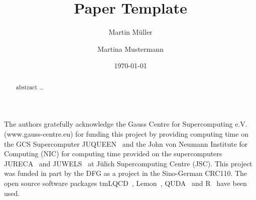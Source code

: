\documentclass[aps,floatfix,prd,nofootinbib,superscriptaddress,reprint,showpacs,10pt,preprintnumbers,longbibliography]{revtex4-1}
\begin{document}
\title{Paper Template}
\author{Martin Müller}
\author{Martina Mustermann}
\date{\today}
\begin{abstract}
  abstract \ldots
\end{abstract}

\maketitle


\begin{acknowledgments}
  The authors gratefully acknowledge the Gauss Centre for Supercomputing
  e.V. (www.gauss-centre.eu) for funding this project by providing
  computing time on the GCS Supercomputer JUQUEEN~\cite{juqueen} and the
  John von Neumann Institute for Computing (NIC) for computing time
  provided on the supercomputers JURECA~\cite{jureca} and JUWELS~\cite{juwels} at Jülich
  Supercomputing Centre (JSC).
  This project was funded in part by the DFG as a project in the
  Sino-German CRC110.
  The open source software packages tmLQCD~\cite{Jansen:2009xp,Abdel-Rehim:2013wba,Deuzeman:2013xaa}, 
  Lemon~\cite{Deuzeman:2011wz}, 
  QUDA~\cite{Clark:2009wm,Babich:2011np,Clark:2016rdz} and R~\cite{R:2019} have 
  been used.
\end{acknowledgments}


\end{document}

